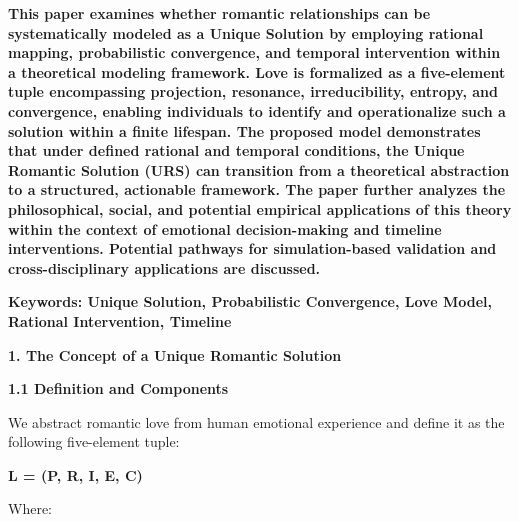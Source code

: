 \documentclass[a4paper]{article}
\begin{document}
\textbf{This paper examines whether romantic relationships can be systematically modeled as a {\textquotedbl}Unique
Solution{\textquotedbl} by employing rational mapping, probabilistic convergence, and temporal intervention within a
theoretical modeling framework. Love is formalized as a five-element tuple encompassing projection, resonance,
irreducibility, entropy, and convergence, enabling individuals to identify and operationalize such a solution within a
finite lifespan. The proposed model demonstrates that under defined rational and temporal conditions, the Unique
Romantic Solution (URS) can transition from a theoretical abstraction to a structured, actionable framework. The paper
further analyzes the philosophical, social, and potential empirical applications of this theory within the context of
emotional decision-making and timeline interventions. Potential pathways for simulation-based validation and
cross-disciplinary applications are discussed.}

\textbf{Keywords: Unique Solution, Probabilistic Convergence, Love Model, Rational Intervention, Timeline}



{\centering\color[HTML]{595959}
\textbf{1. The Concept of a {\textquotedbl}Unique Romantic Solution{\textquotedbl}}
\par}

\textbf{1.1 Definition and Components}

We abstract {\textquotedbl}romantic love{\textquotedbl} from human emotional experience and define it as the following
five-element tuple:

\textbf{L = (P, R, I, E, C)}

Where:
\end{document}
